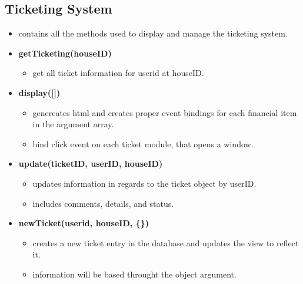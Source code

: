 \documentclass[12pt]{article}
\begin{document}
\subsection{Ticketing System}
\begin{itemize}
  \item contains all the methods used to display and manage the ticketing system.
  \item \textbf{getTicketing(houseID)}
    \begin{itemize}
    \item get all ticket information for userid at houseID.
    \end{itemize}
  \item \textbf{display([])}
    \begin{itemize}
    \item genereates html and creates proper event bindings for each financial item in the argument array.
    \item bind click event on each ticket module, that opens a window.
    \end{itemize}
  \item \textbf{update(ticketID, userID, houseID)}
    \begin{itemize}
    \item updates information in regards to the ticket object by userID.
    \item includes comments, details, and status.
    \end{itemize}
  \item \textbf{newTicket(userid, houseID, \{\})}
    \begin{itemize}
    \item creates a new ticket entry in the database and updates the view to reflect it.
    \item information will be based throught the object argument.
    \end{itemize}
\end{itemize}
\end{document}
